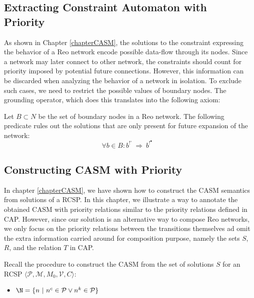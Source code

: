 \subsection{Extracting Constraint Automaton with Priority}
As shown in Chapter \ref{chapterCASM}, the solutions to the constraint expressing the behavior of a Reo network encode possible data-flow through its nodes. Since a network may later connect to other network, the constraints should count for priority imposed by potential future connections. However, this information can be discarded when analyzing the behavior of a network in isolation. To exclude such cases, we need to restrict the possible values of boundary nodes. The grounding operator, which does this translates into the following axiom:

\begin{axiom}
Let $B \subset N$ be the set of boundary nodes in a Reo network. The following predicate rules out the solutions that are only present for future expansion of the network:
$$\forall b \in B: b^{!^\circ}\ \Rightarrow\ b^{!^\bullet}$$
\end{axiom}

\subsection{Constructing CASM with Priority}
In chapter \ref{chapterCASM}, we have shown how to construct the CASM semantics from solutions of a RCSP. In this chapter, we illustrate a way to annotate the obtained CASM with priority relations similar to the priority relations defined in CAP. However, since our solution is an alternative way to compose Reo networks, we only focus on the priority relations between the transitions themselves ad omit the extra information carried around for composition purpose, namely the sets $S$, $R$, and the relation $T$ in CAP.
 
Recall the procedure to construct the CASM from the set of solutions $S$ for an RCSP $\langle \mathcal{P}, \mathcal{M}, M_0,  \mathcal{V}, C \rangle$:

\begin{itemize} 
	\item $\N = \{n~|~ n^c \in \mathcal{P} \vee n^k \in \mathcal{P} \}$
\end{itemize} 

